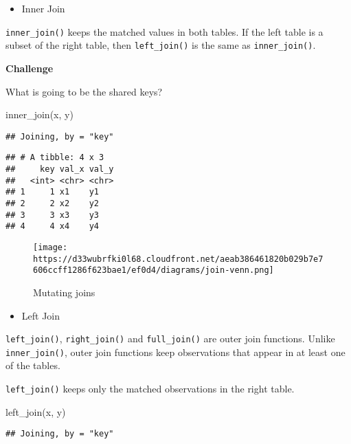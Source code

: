 \documentclass[
]{book}
\newenvironment{Shaded}{\begin{snugshade}}{\end{snugshade}}
\newcommand{\FunctionTok}[1]{\textcolor[rgb]{0.00,0.00,0.00}{#1}}
\newcommand{\NormalTok}[1]{#1}
\providecommand{\tightlist}{%
  \setlength{\itemsep}{0pt}\setlength{\parskip}{0pt}}
\begin{document}
\begin{itemize}
\tightlist
\item
  Inner Join
\end{itemize}

\texttt{inner\_join()} keeps the matched values in both tables. If the left table is a subset of the right table, then \texttt{left\_join()} is the same as \texttt{inner\_join()}.

\textbf{Challenge}

What is going to be the shared keys?

\begin{Shaded}
\begin{Highlighting}[]
\FunctionTok{inner\_join}\NormalTok{(x, y)}
\end{Highlighting}
\end{Shaded}

\begin{verbatim}
## Joining, by = "key"
\end{verbatim}

\begin{verbatim}
## # A tibble: 4 x 3
##     key val_x val_y
##   <int> <chr> <chr>
## 1     1 x1    y1   
## 2     2 x2    y2   
## 3     3 x3    y3   
## 4     4 x4    y4
\end{verbatim}

\begin{figure}
\centering
\texttt{[image: https://d33wubrfki0l68.cloudfront.net/aeab386461820b029b7e7606ccff1286f623bae1/ef0d4/diagrams/join-venn.png]}
\caption{Mutating joins}
\end{figure}

\begin{itemize}
\tightlist
\item
  Left Join
\end{itemize}

\texttt{left\_join()}, \texttt{right\_join()} and \texttt{full\_join()} are outer join functions. Unlike \texttt{inner\_join()}, outer join functions keep observations that appear in at least one of the tables.

\texttt{left\_join()} keeps only the matched observations in the right table.

\begin{Shaded}
\begin{Highlighting}[]
\FunctionTok{left\_join}\NormalTok{(x, y)}
\end{Highlighting}
\end{Shaded}

\begin{verbatim}
## Joining, by = "key"
\end{verbatim}
\end{document}
